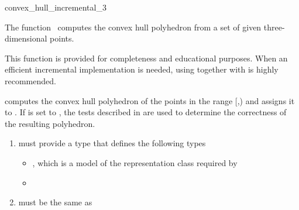 

\begin{ccRefFunction}{convex_hull_incremental_3}  

\ccDefinition
  
The function \ccRefName\ computes the convex hull polyhedron from a set
of given three-dimensional points.

This function is provided for completeness and educational
purposes. When an efficient incremental implementation is needed,
using  together with
 is highly recommended.


            {computes the convex hull polyhedron 
            of the points in the range [,)
            and assigns it to .  If  is set to
            , the tests described in \cite{mnssssu-cgpvg-96} are
            used to determine the correctness of the resulting polyhedron.
            }

\begin{enumerate}
   \item    {} must provide a type 
            that defines the following types
             \begin{itemize}
               \item {}, which is a model of 
                     the representation class  required by
               \item {}
             \end{itemize}
   \item    {} must be the same as
\end{enumerate}


\end{ccRefFunction}
